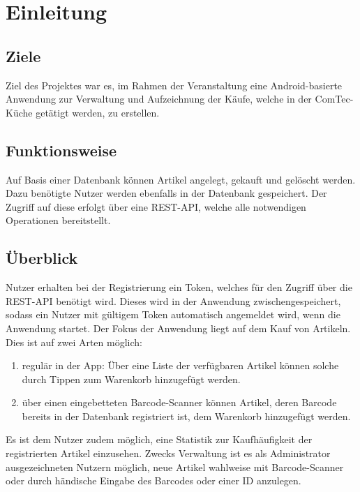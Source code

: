 \section{Einleitung}\label{sec:einleitung}

\subsection{Ziele}\label{subsec:ziele}

Ziel des Projektes war es, im Rahmen der Veranstaltung  eine Android-basierte Anwendung zur Verwaltung und Aufzeichnung der Käufe, welche in der ComTec-Küche getätigt werden, zu erstellen.

\subsection{Funktionsweise}\label{subsec:funktionsweise}

Auf Basis einer Datenbank können Artikel angelegt, gekauft und gelöscht werden.
Dazu benötigte Nutzer werden ebenfalls in der Datenbank gespeichert.
Der Zugriff auf diese erfolgt über eine REST-API, welche alle notwendigen Operationen bereitstellt.

\subsection{Überblick}\label{subsec:überblick}

Nutzer erhalten bei der Registrierung ein Token, welches für den Zugriff über die REST-API benötigt wird.
Dieses wird in der Anwendung zwischengespeichert, sodass ein Nutzer mit gültigem Token automatisch angemeldet wird, wenn die Anwendung startet.
Der Fokus der Anwendung liegt auf dem Kauf von Artikeln.
Dies ist auf zwei Arten möglich:

\begin{enumerate}
	\item regulär in der App: Über eine Liste der verfügbaren Artikel können solche durch Tippen zum Warenkorb hinzugefügt werden.

	\item über einen eingebetteten Barcode-Scanner können Artikel, deren Barcode bereits in der Datenbank registriert ist, dem Warenkorb hinzugefügt werden.
\end{enumerate}

Es ist dem Nutzer zudem möglich, eine Statistik zur Kaufhäufigkeit der registrierten Artikel einzusehen.
Zwecks Verwaltung ist es als Administrator ausgezeichneten Nutzern möglich, neue Artikel wahlweise mit Barcode-Scanner oder durch händische Eingabe des Barcodes oder einer ID anzulegen.

